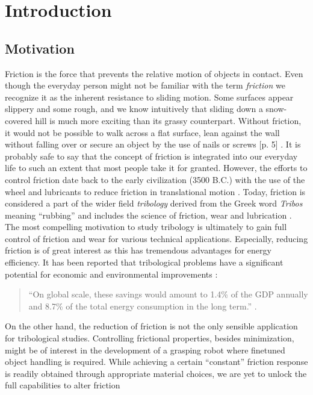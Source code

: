 \chapter{Introduction}


\section{Motivation}
Friction is the force that prevents the relative motion of objects in contact. Even though the everyday person might not be familiar with the
term \textit{friction} we recognize it as the inherent resistance to sliding
motion. Some surfaces appear slippery and some rough, and we know intuitively
that sliding down a snow-covered hill is much more exciting than its grassy
counterpart. Without friction, it would not be possible to walk across a flat
surface, lean against the wall without falling over or secure an object by the
use of nails or screws [p. 5] \cite{gnecco_meyer_2015}. It is probably safe to
say that the concept of friction is integrated into our everyday life to such an
extent that most people take it for granted. However, the efforts to control
friction date back to the early civilization (3500 B.C.) with the use of the
wheel and lubricants to reduce friction in translational motion
\cite{bhushan_2013}. Today, friction is considered a part of the wider field
\textit{tribology} derived from the Greek word \textit{Tribos} meaning
``rubbing'' and includes the science of friction, wear and lubrication
\cite{bhushan_2013}. The most compelling motivation to study tribology is
ultimately to gain full control of friction and wear for various technical
applications. Especially, reducing friction is of great interest as this has
tremendous advantages for energy efficiency. It has been reported that
tribological problems have a significant potential for economic and
environmental improvements \cite{kim_nano-scale_2009}:
\begin{quote}
    ``On global scale, these savings would amount to 1.4\% of the GDP annually
    and 8.7\% of the total energy consumption in the long term.''
    \cite{holmberg_influence_2017}. 
\end{quote}
On the other hand, the reduction of friction is not the only sensible
application for tribological studies. Controlling frictional properties, besides
minimization, might be of interest in the development of a grasping robot where
finetuned object handling is required. While achieving a certain ``constant''
friction response is readily obtained through appropriate material choices, we are yet to unlock the full capabilities to alter friction
